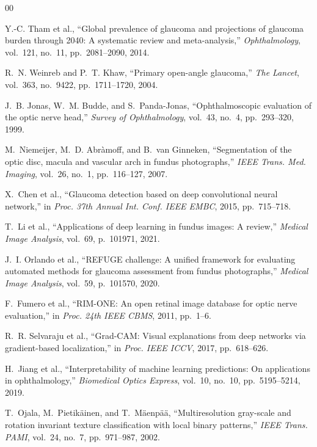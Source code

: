 \documentclass[conference]{IEEEtran}
\begin{document}
\begin{thebibliography}{00}\footnotesize
 
Y.-C. Tham et al., ``Global prevalence of glaucoma and projections
of glaucoma burden through 2040: A systematic review and
meta-analysis,'' \textit{Ophthalmology}, vol.~121, no.~11,
pp.~2081--2090, 2014.
 
R.~N. Weinreb and P.~T. Khaw, ``Primary open-angle glaucoma,''
\textit{The Lancet}, vol.~363, no.~9422, pp.~1711--1720, 2004.
 
J.~B. Jonas, W.~M. Budde, and S.~Panda-Jonas, ``Ophthalmoscopic
evaluation of the optic nerve head,'' \textit{Survey of
Ophthalmology}, vol.~43, no.~4, pp.~293--320, 1999.
 
M.~Niemeijer, M.~D. Abràmoff, and B.~van Ginneken, ``Segmentation
of the optic disc, macula and vascular arch in fundus photographs,''
\textit{IEEE Trans. Med. Imaging}, vol.~26, no.~1,
pp.~116--127, 2007.
 
X.~Chen et al., ``Glaucoma detection based on deep convolutional
neural network,'' in \textit{Proc. 37th Annual Int. Conf. IEEE EMBC},
2015, pp.~715--718.
 
T.~Li et al., ``Applications of deep learning in fundus images:
A review,'' \textit{Medical Image Analysis}, vol.~69,
p.~101971, 2021.
 
J.~I. Orlando et al., ``REFUGE challenge: A unified framework
for evaluating automated methods for glaucoma assessment from
fundus photographs,'' \textit{Medical Image Analysis}, vol.~59,
p.~101570, 2020.
 
F.~Fumero et al., ``RIM-ONE: An open retinal image database for
optic nerve evaluation,'' in \textit{Proc. 24th IEEE CBMS},
2011, pp.~1--6.
 
R.~R. Selvaraju et al., ``Grad-CAM: Visual explanations from deep
networks via gradient-based localization,'' in
\textit{Proc. IEEE ICCV}, 2017, pp.~618--626.
 
H.~Jiang et al., ``Interpretability of machine learning
predictions: On applications in ophthalmology,''
\textit{Biomedical Optics Express}, vol.~10, no.~10,
pp.~5195--5214, 2019.
 
T.~Ojala, M.~Pietikäinen, and T.~Mäenpää, ``Multiresolution
gray-scale and rotation invariant texture classification with
local binary patterns,'' \textit{IEEE Trans. PAMI}, vol.~24,
no.~7, pp.~971--987, 2002.
 

\end{thebibliography}
\end{document}
